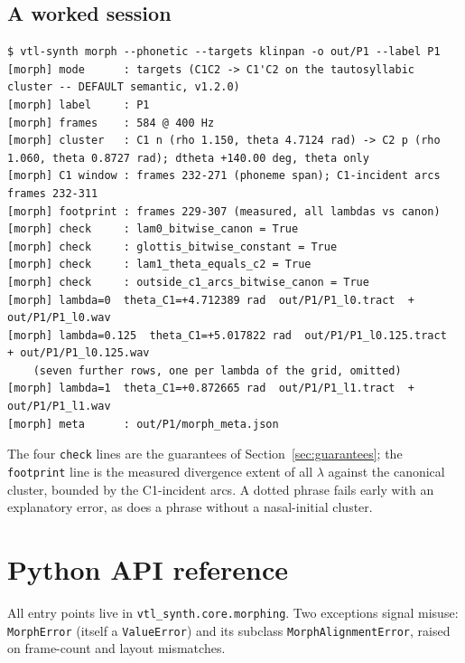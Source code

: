 \documentclass[11pt,a4paper]{article}
\newcommand{\lam}{\lambda}
\newcommand{\code}[1]{\texttt{#1}}
\newcommand{\sectref}[1]{Section~\ref{#1}}
\begin{document}
\subsection{A worked session}

\begin{lstlisting}[style=shell]
$ vtl-synth morph --phonetic --targets klinpan -o out/P1 --label P1
[morph] mode      : targets (C1C2 -> C1'C2 on the tautosyllabic cluster -- DEFAULT semantic, v1.2.0)
[morph] label     : P1
[morph] frames    : 584 @ 400 Hz
[morph] cluster   : C1 n (rho 1.150, theta 4.7124 rad) -> C2 p (rho 1.060, theta 0.8727 rad); dtheta +140.00 deg, theta only
[morph] C1 window : frames 232-271 (phoneme span); C1-incident arcs frames 232-311
[morph] footprint : frames 229-307 (measured, all lambdas vs canon)
[morph] check     : lam0_bitwise_canon = True
[morph] check     : glottis_bitwise_constant = True
[morph] check     : lam1_theta_equals_c2 = True
[morph] check     : outside_c1_arcs_bitwise_canon = True
[morph] lambda=0  theta_C1=+4.712389 rad  out/P1/P1_l0.tract  + out/P1/P1_l0.wav
[morph] lambda=0.125  theta_C1=+5.017822 rad  out/P1/P1_l0.125.tract  + out/P1/P1_l0.125.wav
    (seven further rows, one per lambda of the grid, omitted)
[morph] lambda=1  theta_C1=+0.872665 rad  out/P1/P1_l1.tract  + out/P1/P1_l1.wav
[morph] meta      : out/P1/morph_meta.json
\end{lstlisting}

The four \code{check} lines are the guarantees of
\sectref{sec:guarantees}; the \code{footprint} line is the measured
divergence extent of all $\lam$ against the canonical cluster,
bounded by the C1-incident arcs.  A dotted phrase fails early with
an explanatory error, as does a phrase without a nasal-initial
cluster.

\section{Python API reference}\label{sec:api}

All entry points live in \code{vtl\_synth.core.morphing}.  Two
exceptions signal misuse: \code{MorphError} (itself a
\code{ValueError}) and its subclass \code{MorphAlignmentError},
raised on frame-count and layout mismatches.
\end{document}

